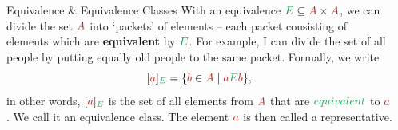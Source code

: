 \documentclass[final]{beamer}
\newlength{\sepwidth}
\newlength{\colwidth}
\newcommand{\separatorcolumn}{\begin{column}{\sepwidth}\end{column}}
\newcommand{\clr}{\textcolor{BrickRed}}
\newcommand{\clg}{\textcolor{ForestGreen}}
\begin{document}
\begin{frame}[t]
\begin{columns}[t]
\begin{column}{\colwidth}
\begin{exampleblock}{Equivalence \& Equivalence Classes}
 With an equivalence $\clg{E} \subseteq \clr{A} \times \clr{A}$, we can divide
 the set $\clr{A}$ into `packets' of elements -- each packet consisting of
 elements which are \textbf{equivalent} by $\clg{E}$. For example, I can divide
 the set of all people by putting equally old people to the same packet.
 Formally, we write
 \[
  [\clr{a}]_{\clg{E}} = \{\clr{b} \in \clr{A} \mid \clr{a}\clg{E}\clr{b}\},
 \]
 in other words, $[\clr{a}]_{\clg{E}}$ is the set of all elements from $\clr{A}$
 that are $\clg{equivalent}$ to $\clr{a}$. We call it \alert{an equivalence
 class}. The element $\clr{a}$ is then called a \alert{representative}. 
\end{exampleblock}

\end{column}
\separatorcolumn

\end{columns}
\end{frame}
\end{document}
